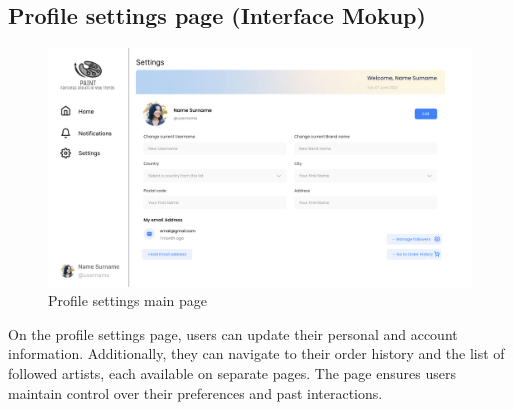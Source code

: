 \subsection{Profile settings page (Interface Mokup)}
\begin{figure}[H]
    \centering
    \includegraphics[width=\myfigwidth]{images/interface_mockups/Profile settings - main page.pdf}
    \caption{Profile settings main page}
\end{figure}

On the profile settings page, users can update their personal and account information. Additionally, they can navigate to their order history and the list of followed artists, each available on separate pages. The page ensures users maintain control over their preferences and past interactions.

